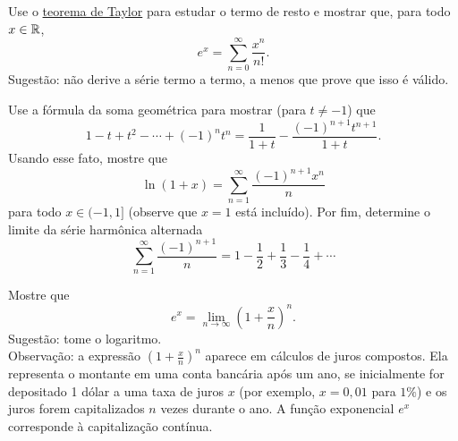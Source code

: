 \begin{exercise}
Use o \hyperref[thm:taylor]{teorema de Taylor} para estudar o termo de resto
e mostrar que, para todo $x \in {\mathbb{R}}$,
\begin{equation*}
e^x = \sum_{n=0}^\infty \frac{x^n}{n!} .
\end{equation*}
Sugestão: não derive a série termo a termo, a menos que prove que isso é
válido.
\end{exercise}

\begin{exercise}
Use a fórmula da soma geométrica para mostrar (para $t \neq -1$) que
\begin{equation*}
1-t+t^2-\cdots+{(-1)}^n t^n = \frac{1}{1+t} - \frac{{(-1)}^{n+1}t^{n+1}}{1+t}.
\end{equation*}
Usando esse fato, mostre que
\begin{equation*}
\ln (1+x) = \sum_{n=1}^\infty \frac{{(-1)}^{n+1}x^n}{n} 
\end{equation*}
para todo $x \in (-1,1]$ (observe que $x=1$ está incluído). Por fim,
determine o limite da série harmônica alternada
\begin{equation*}
\sum_{n=1}^\infty \frac{{(-1)}^{n+1}}{n} = 1 - \frac{1}{2} +
\frac{1}{3} - \frac{1}{4} + \cdots
\end{equation*}
\end{exercise}

\begin{exercise}
Mostre que
\begin{equation*}
e^x = \lim_{n\to\infty} {\left( 1 + \frac{x}{n} \right)}^n .
\end{equation*}
Sugestão: tome o logaritmo.\\
Observação: a expressão
${\left( 1 + \frac{x}{n} \right)}^n$ aparece em cálculos de juros compostos.
Ela representa o montante em uma conta bancária após um ano, se inicialmente
for depositado 1 dólar a uma taxa de juros $x$ (por exemplo, $x=0{,}01$ para
$1\%$) e os juros forem capitalizados $n$ vezes durante o ano. A função
exponencial $e^x$ corresponde à capitalização contínua.
\end{exercise}

